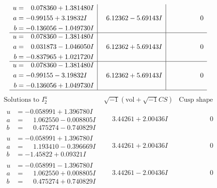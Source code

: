\documentclass[1p]{elsarticle_modified}
\theoremstyle{definition}
\newcommand{\I}{\sqrt{-1}}
\begin{document}
$$\begin{array}{c|c|c}
\begin{aligned}
u &= \phantom{-}0.078360 + 1.381480 I \\
a &= -0.99155 + 3.19832 I \\
b &= -0.136056 - 1.049730 I\end{aligned}
 & \phantom{-}6.12362 - 5.69143 I & \phantom{-0.000000 } 0 \\ \hline\begin{aligned}
u &= \phantom{-}0.078360 - 1.381480 I \\
a &= \phantom{-}0.031873 - 1.046050 I \\
b &= -0.837965 + 1.021720 I\end{aligned}
 & \phantom{-}6.12362 + 5.69143 I & \phantom{-0.000000 } 0 \\ \hline\begin{aligned}
u &= \phantom{-}0.078360 - 1.381480 I \\
a &= -0.99155 - 3.19832 I \\
b &= -0.136056 + 1.049730 I\end{aligned}
 & \phantom{-}6.12362 + 5.69143 I & \phantom{-0.000000 } 0\\
 \hline 
 \end{array}$$\newpage$$\begin{array}{c|c|c}  
\text{Solutions to }I^u_{2}& \I (\text{vol} + \sqrt{-1}CS) & \text{Cusp shape}\\
 \hline 
\begin{aligned}
u &= -0.058991 + 1.396780 I \\
a &= \phantom{-}1.062550 - 0.008805 I \\
b &= \phantom{-}0.475274 - 0.740829 I\end{aligned}
 & \phantom{-}3.44261 + 2.00436 I & \phantom{-0.000000 } 0 \\ \hline\begin{aligned}
u &= -0.058991 + 1.396780 I \\
a &= \phantom{-}1.193410 - 0.396669 I \\
b &= -1.45822 + 0.09321 I\end{aligned}
 & \phantom{-}3.44261 + 2.00436 I & \phantom{-0.000000 } 0 \\ \hline\begin{aligned}
u &= -0.058991 - 1.396780 I \\
a &= \phantom{-}1.062550 + 0.008805 I \\
b &= \phantom{-}0.475274 + 0.740829 I\end{aligned}
 & \phantom{-}3.44261 - 2.00436 I & \phantom{-0.000000 } 0 \\ \hline\begin{aligned}

\end{aligned}
\end{array}$$
\end{document}
